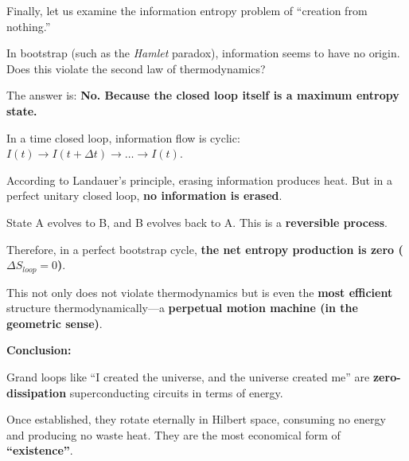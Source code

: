 Finally, let us examine the information entropy problem of ``creation from nothing.''

In bootstrap (such as the \textit{Hamlet} paradox), information seems to have no origin. Does this violate the second law of thermodynamics?

The answer is: \textbf{No. Because the closed loop itself is a maximum entropy state.}

In a time closed loop, information flow is cyclic: $I(t) \to I(t+\Delta t) \to \dots \to I(t)$.

According to Landauer's principle, erasing information produces heat. But in a perfect unitary closed loop, \textbf{no information is erased}.

State A evolves to B, and B evolves back to A. This is a \textbf{reversible process}.

Therefore, in a perfect bootstrap cycle, \textbf{the net entropy production is zero ($\Delta S_{loop} = 0$)}.

This not only does not violate thermodynamics but is even the \textbf{most efficient} structure thermodynamically---a \textbf{perpetual motion machine (in the geometric sense)}.

\textbf{Conclusion:}

Grand loops like ``I created the universe, and the universe created me'' are \textbf{zero-dissipation} superconducting circuits in terms of energy.

Once established, they rotate eternally in Hilbert space, consuming no energy and producing no waste heat. They are the most economical form of \textbf{``existence''}.

